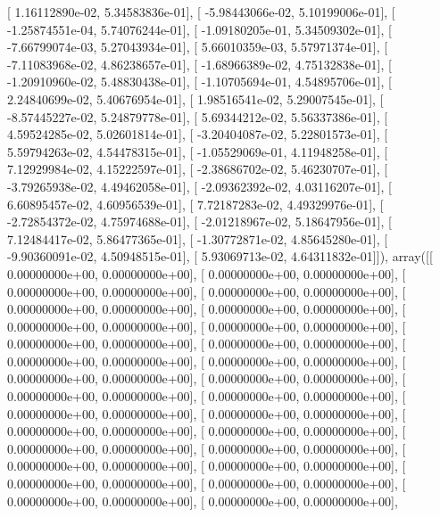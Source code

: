 \documentclass{article}
\begin{document}
       [  1.16112890e-02,   5.34583836e-01],
       [ -5.98443066e-02,   5.10199006e-01],
       [ -1.25874551e-04,   5.74076244e-01],
       [ -1.09180205e-01,   5.34509302e-01],
       [ -7.66799074e-03,   5.27043934e-01],
       [  5.66010359e-03,   5.57971374e-01],
       [ -7.11083968e-02,   4.86238657e-01],
       [ -1.68966389e-02,   4.75132838e-01],
       [ -1.20910960e-02,   5.48830438e-01],
       [ -1.10705694e-01,   4.54895706e-01],
       [  2.24840699e-02,   5.40676954e-01],
       [  1.98516541e-02,   5.29007545e-01],
       [ -8.57445227e-02,   5.24879778e-01],
       [  5.69344212e-02,   5.56337386e-01],
       [  4.59524285e-02,   5.02601814e-01],
       [ -3.20404087e-02,   5.22801573e-01],
       [  5.59794263e-02,   4.54478315e-01],
       [ -1.05529069e-01,   4.11948258e-01],
       [  7.12929984e-02,   4.15222597e-01],
       [ -2.38686702e-02,   5.46230707e-01],
       [ -3.79265938e-02,   4.49462058e-01],
       [ -2.09362392e-02,   4.03116207e-01],
       [  6.60895457e-02,   4.60956539e-01],
       [  7.72187283e-02,   4.49329976e-01],
       [ -2.72854372e-02,   4.75974688e-01],
       [ -2.01218967e-02,   5.18647956e-01],
       [  7.12484417e-02,   5.86477365e-01],
       [ -1.30772871e-02,   4.85645280e-01],
       [ -9.90360091e-02,   4.50948515e-01],
       [  5.93069713e-02,   4.64311832e-01]]), array([[  0.00000000e+00,   0.00000000e+00],
       [  0.00000000e+00,   0.00000000e+00],
       [  0.00000000e+00,   0.00000000e+00],
       [  0.00000000e+00,   0.00000000e+00],
       [  0.00000000e+00,   0.00000000e+00],
       [  0.00000000e+00,   0.00000000e+00],
       [  0.00000000e+00,   0.00000000e+00],
       [  0.00000000e+00,   0.00000000e+00],
       [  0.00000000e+00,   0.00000000e+00],
       [  0.00000000e+00,   0.00000000e+00],
       [  0.00000000e+00,   0.00000000e+00],
       [  0.00000000e+00,   0.00000000e+00],
       [  0.00000000e+00,   0.00000000e+00],
       [  0.00000000e+00,   0.00000000e+00],
       [  0.00000000e+00,   0.00000000e+00],
       [  0.00000000e+00,   0.00000000e+00],
       [  0.00000000e+00,   0.00000000e+00],
       [  0.00000000e+00,   0.00000000e+00],
       [  0.00000000e+00,   0.00000000e+00],
       [  0.00000000e+00,   0.00000000e+00],
       [  0.00000000e+00,   0.00000000e+00],
       [  0.00000000e+00,   0.00000000e+00],
       [  0.00000000e+00,   0.00000000e+00],
       [  0.00000000e+00,   0.00000000e+00],
       [  0.00000000e+00,   0.00000000e+00],
       [  0.00000000e+00,   0.00000000e+00],
       [  0.00000000e+00,   0.00000000e+00],
       [  0.00000000e+00,   0.00000000e+00],
\end{document}
